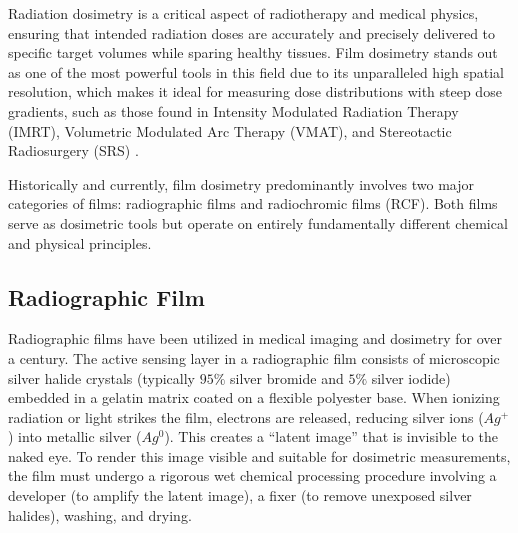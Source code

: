 
Radiation dosimetry is a critical aspect of radiotherapy and medical physics, ensuring that intended radiation doses are accurately and precisely delivered to specific target volumes while sparing healthy tissues. Film dosimetry stands out as one of the most powerful tools in this field due to its unparalleled high spatial resolution, which makes it ideal for measuring dose distributions with steep dose gradients, such as those found in Intensity Modulated Radiation Therapy (IMRT), Volumetric Modulated Arc Therapy (VMAT), and Stereotactic Radiosurgery (SRS) \cite{niroomand2020}.

Historically and currently, film dosimetry predominantly involves two major categories of films: radiographic films and radiochromic films (RCF). Both films serve as dosimetric tools but operate on entirely fundamentally different chemical and physical principles.

\subsection{Radiographic Film}
Radiographic films have been utilized in medical imaging and dosimetry for over a century. The active sensing layer in a radiographic film consists of microscopic silver halide crystals (typically $95\%$ silver bromide and $5\%$ silver iodide) embedded in a gelatin matrix coated on a flexible polyester base. When ionizing radiation or light strikes the film, electrons are released, reducing silver ions ($Ag^+$) into metallic silver ($Ag^0$). This creates a ``latent image'' that is invisible to the naked eye. To render this image visible and suitable for dosimetric measurements, the film must undergo a rigorous wet chemical processing procedure involving a developer (to amplify the latent image), a fixer (to remove unexposed silver halides), washing, and drying.

